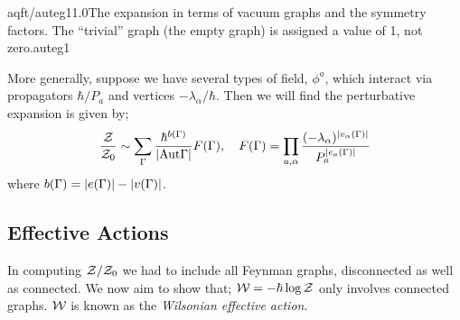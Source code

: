 \begin{mygraphic}{aqft/auteg1}{1.0}{The expansion in terms of vacuum graphs and the symmetry factors. The ``trivial'' graph (the empty graph) is assigned a value of 1, not zero.}{auteg1}\end{mygraphic}
More generally, suppose we have several types of field, $\phi^a$, which interact via propagators $\hbar/P_a$ and vertices $-\lambda_\alpha / \hbar$. Then we will find the perturbative expansion is given by;
\begin{equation}
\frac{\mZ}{\mZ_0} \sim \sum_{\Gamma}{\frac{\hbar^{b(\Gamma)}}{\abs{\text{Aut}\Gamma}}F(\Gamma)}, \quad F(\Gamma) = \prod_{a, \alpha}{\frac{(-\lambda_\alpha)^{\abs{v_{\alpha}(\Gamma)}}}{P_a^{\abs{e_a(\Gamma)}}}}
\end{equation}
where $b(\Gamma) = \abs{e(\Gamma)} - \abs{v(\Gamma)}$.
\subsection{Effective Actions}
In computing $\mathcal{Z} / \mathcal{Z}_0$ we had to include all Feynman graphs, disconnected as well as connected. We now aim to show that; $\mathcal{W} = - \hbar \log \mathcal{Z}$ only involves connected graphs. $\mathcal{W}$ is known as the \emph{Wilsonian effective action}. 

